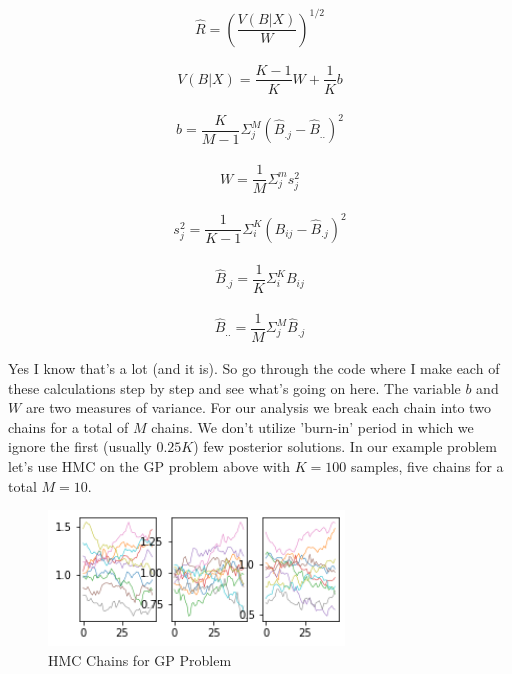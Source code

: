 \documentclass[12pt]{article}
\begin{document}
\begin{equation}
\hat{R}= (\dfrac{V(B|X)}{W})^{1/2}
\end{equation}

\begin{align*}
V(B|X)=\dfrac{K-1}{K}W+\dfrac{1}{K}b
\end{align*}

\begin{align*}
b = \dfrac{K}{M-1}\Sigma_j^M (\hat{B}_{.j}-\hat{B}_{..})^2
\end{align*}

\begin{align*}
W = \dfrac{1}{M}\Sigma_j^m s_j^2
\end{align*}

\begin{align*}
s_j^2 = \dfrac{1}{K-1}\Sigma_i^K (B_{ij}-\hat{B}_{.j})^2
\end{align*}

\begin{align*}
\hat{B}_{.j} = \dfrac{1}{K} \Sigma_i^K B_{ij}
\end{align*}

\begin{align*}
\hat{B}_{..}=\dfrac{1}{M} \Sigma_j^M \hat{B}_{.j}
\end{align*}

\vspace{5mm}

Yes I know that's a lot (and it is). So go through the code where I make each of these calculations step by step and see what's going on here. The variable $b$ and $W$ are two measures of variance. For our analysis we break each chain into two chains for a total of $M$ chains. We don't utilize 'burn-in' period in which we ignore the first (usually $0.25K$) few posterior solutions. In our example problem let's use HMC on the GP problem above with $K=100$ samples, five chains for a total $M=10$. 

\begin{figure}[h]
\centering
\includegraphics[width=0.7\textwidth]{Post_6_gauss5}
\caption{HMC Chains for GP Problem}
\end{figure}
\end{document}
